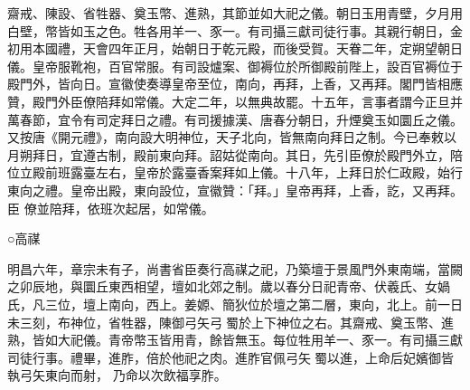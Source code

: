 \begin{pinyinscope}
 齋戒、陳設、省牲器、奠玉幣、進熟，其節並如大祀之儀。朝日玉用青壁，夕月用白壁，幣皆如玉之色。牲各用羊一、豕一。有司攝三獻司徒行事。其親行朝日，金初用本國禮，天會四年正月，始朝日于乾元殿，而後受賀。天眷二年，定朔望朝日儀。皇帝服靴袍，百官常服。有司設爐案、御褥位於所御殿前陛上，設百官褥位于
 殿門外，皆向日。宣徽使奏導皇帝至位，南向，再拜，上香，又再拜。閣門皆相應贊，殿門外臣僚陪拜如常儀。大定二年，以無典故罷。十五年，言事者謂今正旦并萬春節，宜令有司定拜日之禮。有司援據漢、唐春分朝日，升煙奠玉如圜丘之儀。又按唐《開元禮》，南向設大明神位，天子北向，皆無南向拜日之制。今已奉敕以月朔拜日，宜遵古制，殿前東向拜。詔姑從南向。其日，先引臣僚於殿門外立，陪位立殿前班露臺左右，皇帝於露臺香案拜如上儀。十八年，上拜日於仁政殿，始行東向之禮。皇帝出殿，東向設位，宣徽贊：「拜。」皇帝再拜，上香，訖，又再拜。臣
 僚並陪拜，依班次起居，如常儀。



 ○高禖



 明昌六年，章宗未有子，尚書省臣奏行高禖之祀，乃築壇于景風門外東南端，當闕之卯辰地，與圜丘東西相望，壇如北郊之制。歲以春分日祀青帝、伏羲氏、女媧氏，凡三位，壇上南向，西上。姜嫄、簡狄位於壇之第二層，東向，北上。前一日未三刻，布神位，省牲器，陳御弓矢弓蜀於上下神位之右。其齋戒、奠玉幣、進熟，皆如大祀儀。青帝幣玉皆用青，餘皆無玉。每位牲用羊一、豕一。有司攝三獻司徒行事。禮畢，進胙，倍於他祀之肉。進胙官佩弓矢蜀以進，上命后妃嬪御皆執弓矢東向而射，
 乃命以次飲福享胙。



\end{pinyinscope}